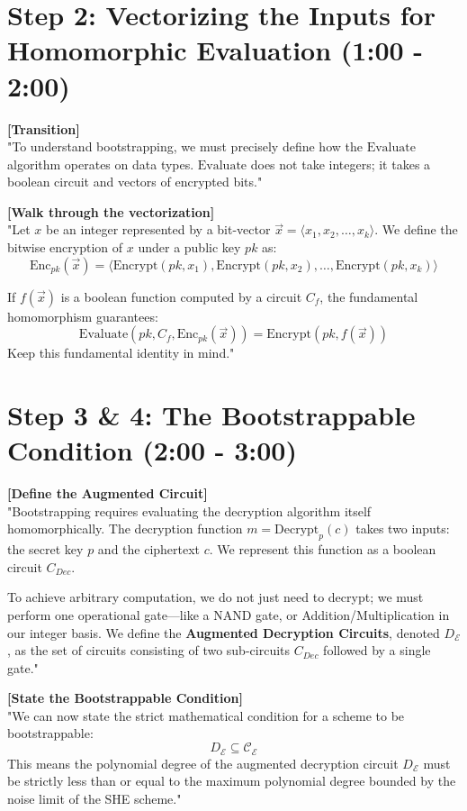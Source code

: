 \documentclass[11pt]{article}
\begin{document}
\section*{Step 2: Vectorizing the Inputs for Homomorphic Evaluation (1:00 - 2:00)}

\textbf{[Transition]} \\
"To understand bootstrapping, we must precisely define how the $\text{Evaluate}$ algorithm operates on data types. $\text{Evaluate}$ does not take integers; it takes a boolean circuit and vectors of encrypted bits."

\textbf{[Walk through the vectorization]} \\
"Let $x$ be an integer represented by a bit-vector $\vec{x} = \langle x_1, x_2, \dots, x_k \rangle$. We define the bitwise encryption of $x$ under a public key $pk$ as:
$$\text{Enc}_{pk}(\vec{x}) = \langle \text{Encrypt}(pk, x_1), \text{Encrypt}(pk, x_2), \dots, \text{Encrypt}(pk, x_k) \rangle$$

If $f(\vec{x})$ is a boolean function computed by a circuit $C_f$, the fundamental homomorphism guarantees:
$$\text{Evaluate}(pk, C_f, \text{Enc}_{pk}(\vec{x})) = \text{Encrypt}(pk, f(\vec{x}))$$
Keep this fundamental identity in mind."

\section*{Step 3 \& 4: The Bootstrappable Condition (2:00 - 3:00)}

\textbf{[Define the Augmented Circuit]} \\
"Bootstrapping requires evaluating the decryption algorithm itself homomorphically. The decryption function $m = \text{Decrypt}_{p}(c)$ takes two inputs: the secret key $p$ and the ciphertext $c$. We represent this function as a boolean circuit $C_{Dec}$.

To achieve arbitrary computation, we do not just need to decrypt; we must perform one operational gate---like a NAND gate, or Addition/Multiplication in our integer basis. We define the \textbf{Augmented Decryption Circuits}, denoted $D_{\mathcal{E}}$, as the set of circuits consisting of two sub-circuits $C_{Dec}$ followed by a single gate."

\textbf{[State the Bootstrappable Condition]} \\
"We can now state the strict mathematical condition for a scheme to be bootstrappable:
$$D_{\mathcal{E}} \subseteq \mathcal{C}_{\mathcal{E}}$$
This means the polynomial degree of the augmented decryption circuit $D_{\mathcal{E}}$ must be strictly less than or equal to the maximum polynomial degree bounded by the noise limit of the SHE scheme."
\end{document}
